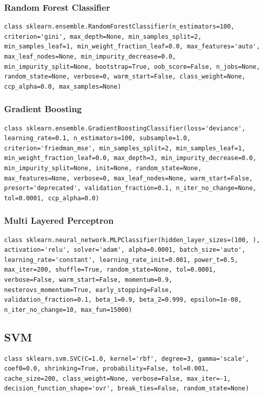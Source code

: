 \documentclass[12pt]{article}
\begin{document}
\subsubsection{Random Forest Classifier}
\begin{lstlisting}
class sklearn.ensemble.RandomForestClassifier(n_estimators=100, criterion='gini', max_depth=None, min_samples_split=2, min_samples_leaf=1, min_weight_fraction_leaf=0.0, max_features='auto', max_leaf_nodes=None, min_impurity_decrease=0.0, min_impurity_split=None, bootstrap=True, oob_score=False, n_jobs=None, random_state=None, verbose=0, warm_start=False, class_weight=None, ccp_alpha=0.0, max_samples=None)
\end{lstlisting}

\subsubsection{Gradient Boosting}
\begin{lstlisting}
class sklearn.ensemble.GradientBoostingClassifier(loss='deviance', learning_rate=0.1, n_estimators=100, subsample=1.0, criterion='friedman_mse', min_samples_split=2, min_samples_leaf=1, min_weight_fraction_leaf=0.0, max_depth=3, min_impurity_decrease=0.0, min_impurity_split=None, init=None, random_state=None, max_features=None, verbose=0, max_leaf_nodes=None, warm_start=False, presort='deprecated', validation_fraction=0.1, n_iter_no_change=None, tol=0.0001, ccp_alpha=0.0)
\end{lstlisting}

\subsubsection{Multi Layered Perceptron}
\begin{lstlisting}
class sklearn.neural_network.MLPClassifier(hidden_layer_sizes=(100, ), activation='relu', solver='adam', alpha=0.0001, batch_size='auto', learning_rate='constant', learning_rate_init=0.001, power_t=0.5, max_iter=200, shuffle=True, random_state=None, tol=0.0001, verbose=False, warm_start=False, momentum=0.9, nesterovs_momentum=True, early_stopping=False, validation_fraction=0.1, beta_1=0.9, beta_2=0.999, epsilon=1e-08, n_iter_no_change=10, max_fun=15000)
\end{lstlisting}

\subsection{SVM}
\begin{lstlisting}
class sklearn.svm.SVC(C=1.0, kernel='rbf', degree=3, gamma='scale', coef0=0.0, shrinking=True, probability=False, tol=0.001, cache_size=200, class_weight=None, verbose=False, max_iter=-1, decision_function_shape='ovr', break_ties=False, random_state=None)
\end{lstlisting}
\end{document}
